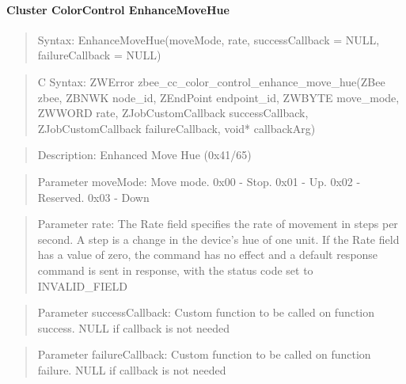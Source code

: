 \paragraph{Cluster ColorControl EnhanceMoveHue}
\begin{quote}Syntax: EnhanceMoveHue(moveMode, rate, successCallback = NULL, failureCallback = NULL)\end{quote}
\begin{quote}C Syntax: ZWError zbee\_cc\_color\_control\_enhance\_move\_hue(ZBee zbee, ZBNWK node\_id, ZEndPoint endpoint\_id, ZWBYTE move\_mode, ZWWORD rate, ZJobCustomCallback successCallback, ZJobCustomCallback failureCallback, void* callbackArg)\end{quote}
\begin{quote}Description: Enhanced Move Hue (0x41/65)\end{quote}
\begin{quote}Parameter moveMode: Move mode. 0x00 - Stop. 0x01 - Up. 0x02 - Reserved. 0x03 - Down\end{quote}
\begin{quote}Parameter rate: The Rate field specifies the rate of movement in steps per second. A step is a change in the device’s hue of one unit. If the Rate field has a value of zero, the command has no effect and a default response command is sent in response, with the status code set to INVALID\_FIELD\end{quote}
\begin{quote}Parameter successCallback: Custom function to be called on function success. NULL if callback is not needed\end{quote}
\begin{quote}Parameter failureCallback: Custom function to be called on function failure. NULL if callback is not needed\end{quote}


